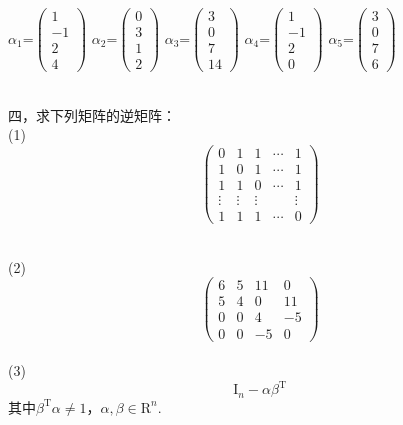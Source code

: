 \documentclass[12pt, a4paper, oneside]{ctexart}
\begin{document}
$\alpha_1$=$\left (\begin{array}{rrrr}
1\\
-1 \\
2 \\
4
\end{array}\right)$
$\alpha_2$=$\left (\begin{array}{rrrr}
0\\
3 \\
1 \\
2
\end{array}\right)$
$\alpha_3$=$\left (\begin{array}{rrrr}
3\\
0 \\
7 \\
14
\end{array}\right)$
$\alpha_4$=$\left (\begin{array}{rrrr}
1\\
-1 \\
2 \\
0
\end{array}\right)$
$\alpha_5$=$\left (\begin{array}{rrrr}
3\\
0 \\
7 \\
6
\end{array}\right)$

\;

\;
\\四，求下列矩阵的逆矩阵：
\;
\\(1)\\
$$\left (\begin{array}{rrrrr}
0 & 1 & 1 & \cdots & 1\\
1 & 0 & 1 & \cdots & 1\\
1 & 1 & 0 & \cdots & 1\\
\vdots & \vdots & \vdots & \; & \vdots\\
1 & 1 & 1 & \cdots & 0
\end{array}\right)$$

\;
\\(2)\\
$$\left (\begin{array}{rrrr}
6 & 5 & 11 & 0\\
5 & 4 & 0 & 11\\
0 & 0 & 4 & -5 \\
0 & 0 & -5 & 0
\end{array}\right)$$
\;\\
(3)\\$$\mathrm{I}_n-\alpha\beta^{\mathrm{T}}$$
其中$\beta^{\mathrm{T}}\alpha\neq1$，$\alpha,\beta\in\mathrm{R}^n$.
\end{document}
